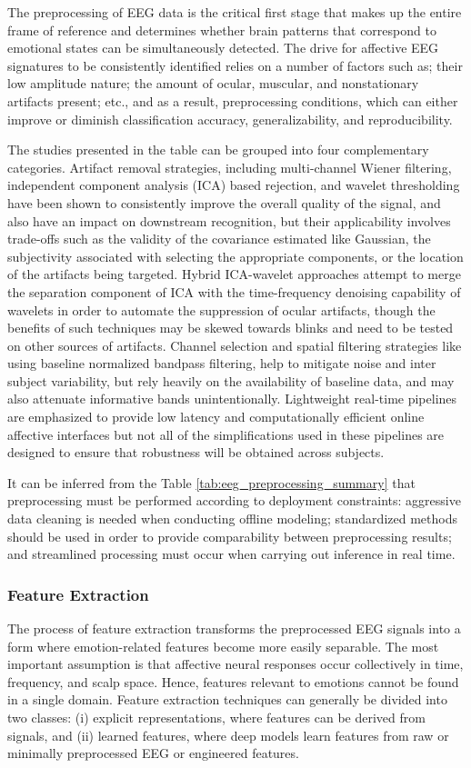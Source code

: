\documentclass{WileyMSP-template}
\begin{document}
The preprocessing of EEG data is the critical first stage that makes up the entire frame of reference and determines whether brain patterns that correspond to emotional states can be simultaneously detected. The drive for affective EEG signatures to be consistently identified relies on a number of factors such as; their low amplitude nature; the amount of ocular, muscular, and nonstationary artifacts present; etc., and as a result, preprocessing conditions, which can either improve or diminish classification accuracy, generalizability, and reproducibility. 

The studies presented in the table can be grouped into four complementary categories. Artifact removal strategies, including multi-channel Wiener filtering, independent component analysis (ICA) based rejection, and wavelet thresholding have been shown to consistently improve the overall quality of the signal, and also have an impact on downstream recognition, but their applicability involves trade-offs such as the validity of the covariance estimated like Gaussian, the subjectivity associated with selecting the appropriate components, or the location of the artifacts being targeted. Hybrid ICA-wavelet approaches attempt to merge the separation component of ICA with the time-frequency denoising capability of wavelets in order to automate the suppression of ocular artifacts, though the benefits of such techniques may be skewed towards blinks and need to be tested on other sources of artifacts. Channel selection and spatial filtering strategies like using baseline normalized bandpass filtering, help to mitigate noise and inter subject variability, but rely heavily on the availability of baseline data, and may also attenuate informative bands unintentionally. Lightweight real-time pipelines are emphasized to provide low latency and computationally efficient online affective interfaces but not all of the simplifications used in these pipelines are designed to ensure that robustness will be obtained across subjects.

It can be inferred from the Table \ref{tab:eeg_preprocessing_summary} that preprocessing must be performed according to deployment constraints: aggressive data cleaning is needed when conducting offline modeling; standardized methods should be used in order to provide comparability between preprocessing results; and streamlined processing must occur when carrying out inference in real time.

\subsubsection{Feature Extraction}
The process of feature extraction transforms the preprocessed EEG signals into a form where emotion-related features become more easily separable. The most important assumption is that affective neural responses occur collectively in time, frequency, and scalp space. Hence, features relevant to emotions cannot be found in a single domain. Feature extraction techniques can generally be divided into two classes: (i) explicit representations, where features can be derived from signals, and (ii) learned features, where deep models learn features from raw or minimally preprocessed EEG or engineered features.
\end{document}
